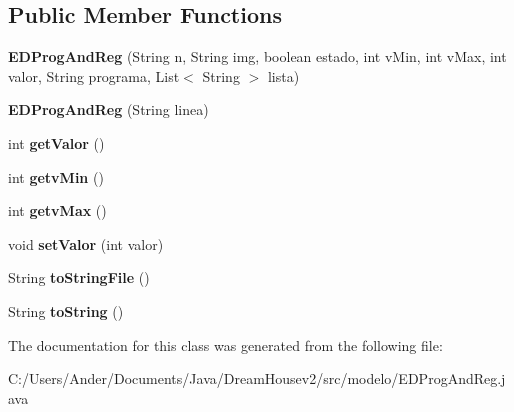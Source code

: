 \subsection*{Public Member Functions}
\begin{DoxyCompactItemize}
\item 
\mbox{\label{classmodelo_1_1_e_d_prog_and_reg_a59fd32988f0e7886544d49601d554d11}} 
{\bfseries E\+D\+Prog\+And\+Reg} (String n, String img, boolean estado, int v\+Min, int v\+Max, int valor, String programa, List$<$ String $>$ lista)
\item 
\mbox{\label{classmodelo_1_1_e_d_prog_and_reg_a0c934bb38fa4acafb27014c962966c86}} 
{\bfseries E\+D\+Prog\+And\+Reg} (String linea)
\item 
\mbox{\label{classmodelo_1_1_e_d_prog_and_reg_a357c68f3e389b1b7be1d0991ca1af7f4}} 
int {\bfseries get\+Valor} ()
\item 
\mbox{\label{classmodelo_1_1_e_d_prog_and_reg_a1f67e7a977bd3c7ed6a551f103dda7b2}} 
int {\bfseries getv\+Min} ()
\item 
\mbox{\label{classmodelo_1_1_e_d_prog_and_reg_a606f1c6e59684cf36e9e232f1c8c74b5}} 
int {\bfseries getv\+Max} ()
\item 
\mbox{\label{classmodelo_1_1_e_d_prog_and_reg_acd217e74e210b80ab0ae9028d8d2e238}} 
void {\bfseries set\+Valor} (int valor)
\item 
\mbox{\label{classmodelo_1_1_e_d_prog_and_reg_a9bb036d2596a73b2af9a9959ad564b31}} 
String {\bfseries to\+String\+File} ()
\item 
\mbox{\label{classmodelo_1_1_e_d_prog_and_reg_a7f61e2cc66f9d7adb21d0829e6b49d06}} 
String {\bfseries to\+String} ()
\end{DoxyCompactItemize}


The documentation for this class was generated from the following file\+:\begin{DoxyCompactItemize}
\item 
C\+:/\+Users/\+Ander/\+Documents/\+Java/\+Dream\+Housev2/src/modelo/E\+D\+Prog\+And\+Reg.\+java\end{DoxyCompactItemize}
